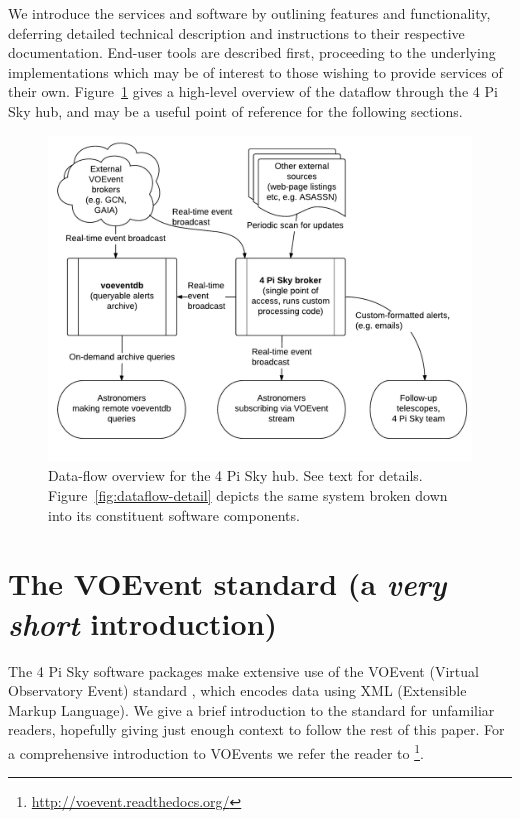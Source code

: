 \documentclass[5p,authoryear]{elsarticle}
\begin{document}
We introduce the services and software by outlining features and functionality, deferring detailed technical description and instructions to their respective documentation.
End-user tools are described first, proceeding to the underlying implementations which may be of interest to those wishing to provide services of their own. 
Figure~\ref{fig:dataflow-overview} gives a high-level overview of the dataflow through the 4 Pi Sky hub, and may be a useful point of reference for the following sections.

\begin{figure}[htp]
\begin{center}  
  \includegraphics[width=.96\textwidth]{figures/voevent-hub-simple-overview}
  \caption[Dataflow overview for the 4 Pi Sky hub]{%
  Data-flow overview for the 4 Pi Sky hub. See text for details. 
  Figure~\ref{fig:dataflow-detail} depicts the same system broken down into its constituent software components.
\label{fig:dataflow-overview}
} 
\end{center} 
\end{figure}

\section{The VOEvent standard (a \textit{very short} introduction)}
The 4 Pi Sky software packages make extensive use of the VOEvent (Virtual Observatory Event) standard \citep{Seaman2008,Seaman2011}, which encodes data using XML (Extensible Markup Language). 
We give a brief introduction to the standard for unfamiliar readers, hopefully giving just enough context to follow the rest of this paper.
For a comprehensive introduction to VOEvents we refer the reader to \citet{Swinbank2015}\footnote{%
\url{http://voevent.readthedocs.org/}
}.
\end{document}

